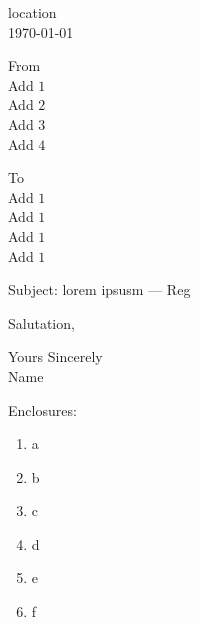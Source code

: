 \documentclass[a4paper,12pt,oneside,final]{article}
\begin{document}
	\begin{flushright}
		location \\
		\today  \\
	\end{flushright}
	\begin{flushleft}
		From \\
		Add $1$\\
		Add $2$ \\
		Add $3$ \\
		Add $4$
	\end{flushleft}
	\begin{flushleft}
		To \\
		Add $1$ \\
		Add $1$ \\
		Add $1$ \\
		Add $1$ \\
	\end{flushleft}
	Subject: lorem ipsusm --- Reg
	\begin{flushleft}
		Salutation, \\
	\end{flushleft}
	\lipsum[1-2]
	\begin{flushright}
		Yours Sincerely \\
		\vspace{1\baselineskip}
		Name \\
	\end{flushright}
	\begin{flushleft}
		Enclosures:
		\begin{enumerate}
			\item a
			\item b
			\item c
			\item d
			\item e
			\item f
		\end{enumerate}
	\end{flushleft}
\end{document}
